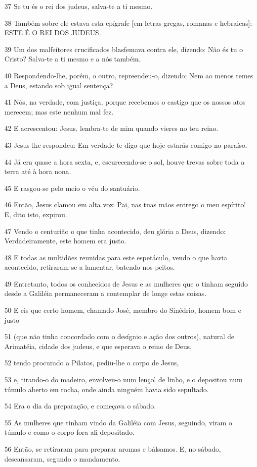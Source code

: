 \par 37 Se tu és o rei dos judeus, salva-te a ti mesmo.
\par 38 Também sobre ele estava esta epígrafe [em letras gregas, romanas e hebraicas]: ESTE É O REI DOS JUDEUS.
\par 39 Um dos malfeitores crucificados blasfemava contra ele, dizendo: Não és tu o Cristo? Salva-te a ti mesmo e a nós também.
\par 40 Respondendo-lhe, porém, o outro, repreendeu-o, dizendo: Nem ao menos temes a Deus, estando sob igual sentença?
\par 41 Nós, na verdade, com justiça, porque recebemos o castigo que os nossos atos merecem; mas este nenhum mal fez.
\par 42 E acrescentou: Jesus, lembra-te de mim quando vieres no teu reino.
\par 43 Jesus lhe respondeu: Em verdade te digo que hoje estarás comigo no paraíso.
\par 44 Já era quase a hora sexta, e, escurecendo-se o sol, houve trevas sobre toda a terra até à hora nona.
\par 45 E rasgou-se pelo meio o véu do santuário.
\par 46 Então, Jesus clamou em alta voz: Pai, nas tuas mãos entrego o meu espírito! E, dito isto, expirou.
\par 47 Vendo o centurião o que tinha acontecido, deu glória a Deus, dizendo: Verdadeiramente, este homem era justo.
\par 48 E todas as multidões reunidas para este espetáculo, vendo o que havia acontecido, retiraram-se a lamentar, batendo nos peitos.
\par 49 Entretanto, todos os conhecidos de Jesus e as mulheres que o tinham seguido desde a Galiléia permaneceram a contemplar de longe estas coisas.
\par 50 E eis que certo homem, chamado José, membro do Sinédrio, homem bom e justo
\par 51 (que não tinha concordado com o desígnio e ação dos outros), natural de Arimatéia, cidade dos judeus, e que esperava o reino de Deus,
\par 52 tendo procurado a Pilatos, pediu-lhe o corpo de Jesus,
\par 53 e, tirando-o do madeiro, envolveu-o num lençol de linho, e o depositou num túmulo aberto em rocha, onde ainda ninguém havia sido sepultado.
\par 54 Era o dia da preparação, e começava o sábado.
\par 55 As mulheres que tinham vindo da Galiléia com Jesus, seguindo, viram o túmulo e como o corpo fora ali depositado.
\par 56 Então, se retiraram para preparar aromas e bálsamos. E, no sábado, descansaram, segundo o mandamento.

